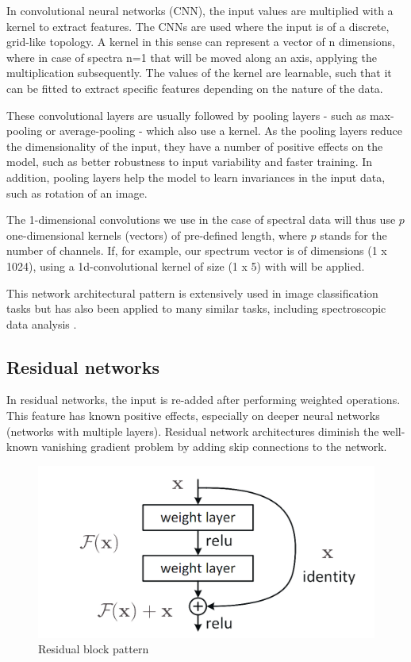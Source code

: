 In convolutional neural networks (CNN), the input values are multiplied with a kernel to extract features. The CNNs are used where the input is of a discrete, grid-like topology. A kernel in this sense can represent a vector of n dimensions, where in case of spectra n=1 that will be moved along an axis, applying the multiplication subsequently. The values of the kernel are learnable, such that it can be fitted to extract specific features depending on the nature of the data.

These convolutional layers are usually followed by pooling layers - such as max-pooling or average-pooling - which also use a kernel. As the pooling layers reduce the dimensionality of the input, they have a number of positive effects on the model, such as better robustness to input variability and faster training. In addition, pooling layers help the model to learn invariances in the input data, such as rotation of an image. 

The 1-dimensional convolutions we use in the case of spectral data will thus use $p$ one-dimensional kernels (vectors) of pre-defined length, where $p$ stands for the number of channels. If, for example, our spectrum vector is of dimensions (1 x 1024), using a 1d-convolutional kernel of size (1 x 5) with will be applied.

This network architectural pattern is extensively used in image classification tasks but has also been applied to many similar tasks, including spectroscopic data analysis \cite{sun_cnnlstm_2023, castorena_deep_2021, drera_deep_2019}.

\subsection{Residual networks}

In residual networks, the input is re-added after performing weighted operations. This feature has known positive effects, especially on deeper neural networks (networks with multiple layers). Residual network architectures diminish the well-known vanishing gradient problem by adding skip connections to the network. 

\begin{figure}
    \centering
    \includegraphics[width=\textwidth]{Figures/ResBlockVariants.png}
    \caption{Residual block pattern}
    \label{fig:res_block}
\end{figure}

